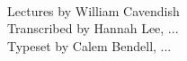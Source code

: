 \begin{titlepage}

\begin{center}
\large

\hfill
\vfill

\begingroup
\color{Maroon}{\LARGE\textsc Maths 223 \\ \Large Lecture Notes Winter 2014} \\ \bigskip %
\endgroup

\vfill

Lectures by William Cavendish \\
Transcribed by Hannah Lee, ... \\
Typeset by Calem Bendell, ...

\vfill

\end{center}


\end{titlepage}